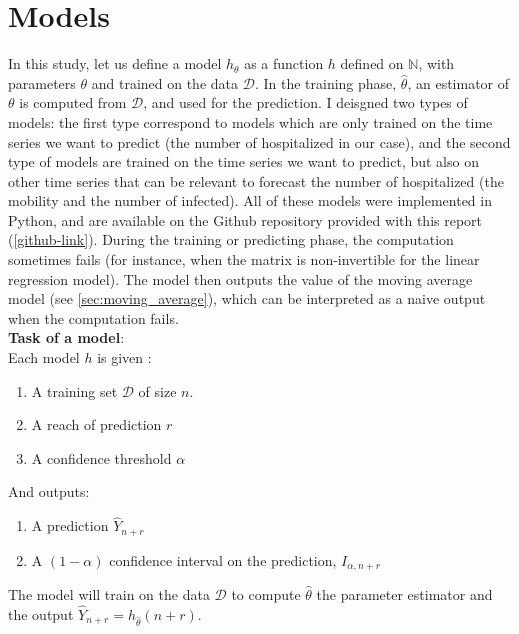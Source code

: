 \section{Models}



In this study, let us define a model ${h}_{\theta }$ as a function ${h}$  defined on $ \mathbb{N}$, with parameters $\theta$ and trained on the data $\mathcal{D}$.
In the training phase, $\hat{\theta}$,  an estimator of $\theta$ is computed from $\mathcal{D}$, and used for the prediction.  
I deisgned two types of models: the first type correspond to models which are only trained on the time series we want to predict (the number of hospitalized in our case), and the second type of models are trained on the time series we want to predict, but also on other time series that can be relevant to forecast the number of hospitalized (the mobility and the number of infected). 
All of these models were implemented in Python, and are available on the Github repository provided with this report (\ref{github-link}).
During the training or predicting phase, the computation sometimes fails (for instance, when the matrix is non-invertible for the linear regression model). 
The model then outputs the value of the moving average model (see \ref{sec:moving_average}), which can be interpreted as a naive output when the computation fails. \\[0.3cm]
\textbf{Task of a model}: \\

Each model ${h}$ is given : 

\begin{enumerate}
    \item A training set $\mathcal{D}$ of size $n$. 
    \item A reach of prediction $r$
    \item A confidence threshold $\alpha$
\end{enumerate}


And outputs: 

\begin{enumerate}
    \item A prediction $\hat{Y}_{n+r}$
    \item A $(1-\alpha)$ confidence interval on the prediction, $I_{\alpha, n+r}$
\end{enumerate}

The model will train on the data $\mathcal{D}$ to compute $\hat{\theta}$ the parameter estimator and the output $\hat{Y}_{n+r} = {h}_{\hat{\theta}}(n+r)$.


